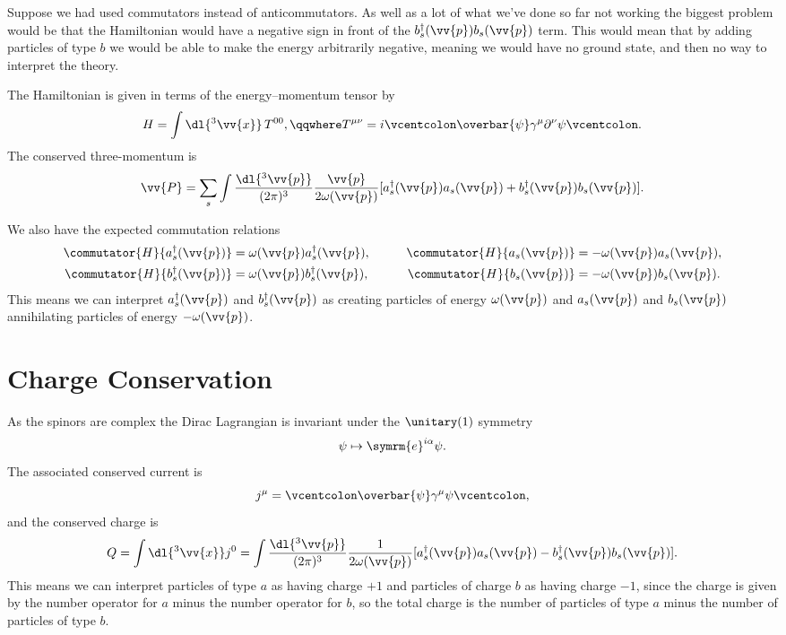 \documentclass[fleqn]{NotesClass}
\newcommand{\e}{\symrm{e}}
\newcommand{\hermit}{{\dagger}}
\newcommand{\normalordering}[1]{\mathopen{\vcentcolon}{#1}\mathclose{\vcentcolon}}
\newcommand{\diracadjoint}[1]{\overbar{#1}}
\begin{document}
    Suppose we had used commutators instead of anticommutators.
    As well as a lot of what we've done so far not working the biggest problem would be that the Hamiltonian would have a negative sign in front of the \(b_s^\hermit(\vv{p})b_s(\vv{p})\) term.
    This would mean that by adding particles of type \(b\) we would be able to make the energy arbitrarily negative, meaning we would have no ground state, and then no way to interpret the theory.
    
    The Hamiltonian is given in terms of the energy--momentum tensor by
    \begin{equation}
        H = \int \dl{^3\vv{x}} \, T^{00}, \qqwhere T^{\mu\nu} = i \normalordering{\diracadjoint{\psi} \gamma^\mu \partial^\nu \psi}.
    \end{equation}
    The conserved three-momentum is
    \begin{equation}
        \vv{P} = \sum_s \int \frac{\dl{^3\vv{p}}}{(2\pi)^3} \frac{\vv{p}}{2\omega(\vv{p})} [a_s^\hermit(\vv{p})a_s(\vv{p}) + b_s^\hermit(\vv{p})b_s(\vv{p})].
    \end{equation}
    
    We also have the expected commutation relations
    \begin{alignat}{2}
        \commutator{H}{a_s^\hermit(\vv{p})} &= \omega(\vv{p})a_s^\hermit(\vv{p}), \qquad & \commutator{H}{a_s(\vv{p})} &= -\omega(\vv{p})a_s(\vv{p}),\\
        \commutator{H}{b_s^\hermit(\vv{p})} &= \omega(\vv{p})b_s^\hermit(\vv{p}), \qquad & \commutator{H}{b_s(\vv{p})} &= -\omega(\vv{p})b_s(\vv{p}).
    \end{alignat}
    This means we can interpret \(a_s^\hermit(\vv{p})\) and \(b_s^\hermit(\vv{p})\) as creating particles of energy \(\omega(\vv{p})\) and \(a_s(\vv{p})\) and \(b_s(\vv{p})\) annihilating particles of energy \(-\omega(\vv{p})\).
    
    \section{Charge Conservation}
    As the spinors are complex the Dirac Lagrangian is invariant under the \(\unitary(1)\) symmetry
    \begin{equation}
        \psi \mapsto \e^{i\alpha}\psi.
    \end{equation}
    The associated conserved current is
    \begin{equation}
        j^\mu = \normalordering{\diracadjoint{\psi} \gamma^\mu \psi},
    \end{equation}
    and the conserved charge is
    \begin{equation}
        Q = \int \dl{^3\vv{x}} j^0 = \int \frac{\dl{^3\vv{p}}}{(2\pi)^3} \frac{1}{2\omega(\vv{p})} [a_s^\hermit(\vv{p}) a_s(\vv{p}) - b_s^\hermit(\vv{p}) b_s(\vv{p})].
    \end{equation}
    This means we can interpret particles of type \(a\) as having charge \(+1\) and particles of charge \(b\) as having charge \(-1\), since the charge is given by the number operator for \(a\) minus the number operator for \(b\), so the total charge is the number of particles of type \(a\) minus the number of particles of type \(b\).
    
\end{document}
